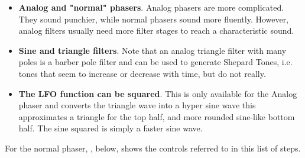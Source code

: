    \begin{itemize}
      \item \textbf{Analog and "normal" phasers}.
      Analog phasers are more complicated.
      They sound punchier, while normal phasers sound more fluently. However,
      analog filters usually need more filter stages to reach a
      characteristic sound.
      \item \textbf{Sine and triangle filters}.
      Note that an analog triangle filter
      with many poles is a barber pole filter and can be used to generate
      Shepard Tones, i.e. tones that seem to increase or decrease with time,
      but do not really.
      \item \textbf{The LFO function can be squared}.
      This is only available for the Analog phaser and converts the triangle
      wave into a hyper sine wave this approximates a triangle for the top
      half, and more rounded sine-like bottom half. The sine squared is simply
      a faster sine wave.
   \end{itemize}


   For the normal phaser,
   , below, shows the controls referred to
   in this list of steps.

